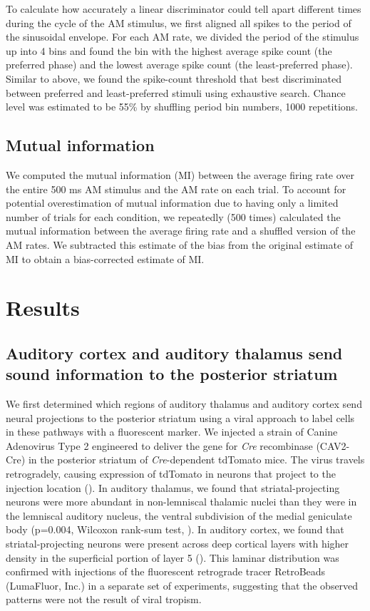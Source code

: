 To calculate how accurately a linear discriminator could tell apart different times during the cycle of the AM stimulus, we first aligned all spikes to the period of the sinusoidal envelope.
%
For each AM rate, we divided the period of the stimulus up into 4 bins and found the bin with the highest average spike count (the preferred phase) and the lowest average spike count (the least-preferred phase).
%
Similar to above, we found the spike-count threshold that best discriminated between preferred and least-preferred stimuli using exhaustive search. 
%
Chance level was estimated to be 55\% by shuffling period bin numbers, 1000 repetitions. 


\subsection{Mutual information}
%
We computed the mutual information (MI) between the average firing rate over the entire 500 ms AM stimulus and the AM rate on each trial. 
%
To account for potential overestimation of mutual information due to having only a limited number of trials for each condition, we repeatedly (500 times) calculated the mutual information between the average firing rate and a shuffled version of the AM rates. 
%
We subtracted this estimate of the bias from the original estimate of MI to obtain a bias-corrected estimate of MI.


\section{Results}

\subsection{Auditory cortex and auditory thalamus send sound information to the posterior striatum}

We first determined which regions of auditory thalamus and auditory cortex send neural projections to the posterior striatum using a viral approach to label cells in these pathways with a fluorescent marker.
%
We injected a strain of Canine Adenovirus Type 2 engineered to deliver the gene for \textit{Cre} recombinase (CAV2-Cre) in the posterior striatum of \textit{Cre}-dependent tdTomato mice.  
%
The virus travels retrogradely, causing expression of tdTomato in neurons that project to the injection location (\fig{\AnatomyInjection}).
%
In auditory thalamus, we found that striatal-projecting neurons were more abundant in non-lemniscal thalamic nuclei than they were in the lemniscal auditory nucleus, the ventral subdivision of the medial geniculate body (p=0.004, Wilcoxon rank-sum test, \fig{\AnatomyThalamus}).
%
In auditory cortex, we found that striatal-projecting neurons were present across deep cortical layers with higher density in the superficial portion of layer 5 (\fig{\AnatomyAC}). 
%
This laminar distribution was confirmed with injections of the fluorescent retrograde tracer RetroBeads (LumaFluor, Inc.) in a separate set of experiments, suggesting that the observed patterns were not the result of viral tropism. 

